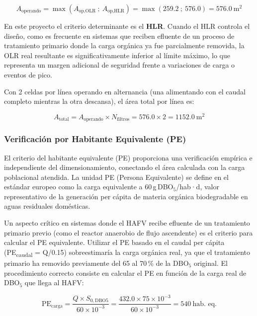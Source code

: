 \documentclass[12pt,a4paper]{article}
\newcommand{\captionequation}[1]{}
\begin{document}
\begin{equation}
A_\text{operando} = \max\!\left(A_\text{op,OLR}\ ;\ A_\text{op,HLR}\right) = \max\!\left(259.2\ ;\ 576.0\right) = 576.0\ \text{m}^2
\end{equation}
\captionequation{Área del filtro activo adoptada -- criterio dominante: \textbf{HLR}}

En este proyecto el criterio determinante es el \textbf{HLR}. Cuando el HLR controla el diseño, como es frecuente en sistemas que reciben efluente de un proceso de tratamiento primario donde la carga orgánica ya fue parcialmente removida, la OLR real resultante es significativamente inferior al límite máximo, lo que representa un margen adicional de seguridad frente a variaciones de carga o eventos de pico.

Con 2 celdas por línea operando en alternancia (una alimentando con el caudal completo mientras la otra descansa), el área total por línea es:

\begin{equation}
A_\text{total} = A_\text{operando} \times N_\text{filtros} = 576.0 \times 2 = 1152.0\ \text{m}^2
\end{equation}
\captionequation{Área total construida del sistema HAFV}

\subsubsection*{Verificación por Habitante Equivalente (PE)}

El criterio del habitante equivalente (PE) proporciona una verificación empírica e independiente del dimensionamiento, conectando el área calculada con la carga poblacional atendida. La unidad PE (Persona Equivalente) se define en el estándar europeo como la carga equivalente a 60\,g\,DBO$_5$/hab·d, valor representativo de la generación per cápita de materia orgánica biodegradable en aguas residuales domésticas.

Un aspecto crítico en sistemas donde el HAFV recibe efluente de un tratamiento primario previo (como el reactor anaerobio de flujo ascendente) es el criterio para calcular el PE equivalente. Utilizar el PE basado en el caudal per cápita (PE\textsubscript{caudal} = Q/0.15) sobreestimaría la carga orgánica real, ya que el tratamiento primario ha removido previamente del 65 al 70\,\% de la DBO$_5$ original. El procedimiento correcto consiste en calcular el PE en función de la carga real de DBO$_5$ que llega al HAFV:

\begin{equation}
\text{PE}_\text{carga} = \frac{Q \times S_{0,\text{DBO5}}}{60 \times 10^{-3}} = \frac{432.0 \times 75 \times 10^{-3}}{60 \times 10^{-3}} = 540\ \text{hab. eq.}
\end{equation}
\captionequation{Habitante equivalente calculado a partir de la carga real de DBO$_5$ en el afluente al HAFV}
\end{document}
